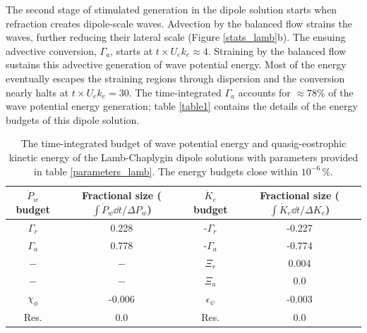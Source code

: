 \documentclass{jfm}
\begin{document}
The second stage of stimulated generation in the dipole solution starts when
refraction creates dipole-scale waves. Advection by the balanced flow
strains the waves, further reducing their lateral scale (Figure
\ref{stats_lamb}b). The ensuing advective conversion, $\Gamma_a$, starts
at $t\times U_e k_e \approx 4$. Straining by the balanced flow sustains this
advective generation of wave potential energy. Most of the energy eventually
escapes the straining regions through dispersion and the conversion nearly halts at
$t\times U_e k_e = 30$.
The time-integrated $\Gamma_a$ accounts for $\approx 78\%$ of the
wave potential energy generation; table \eqref{table1} contains the details
of the energy budgets of this dipole solution.

%
\begin{table}
\begin{center}
    \caption{The time-integrated budget of wave potential energy and quasig-eostrophic                kinetic energy of the Lamb-Chaplygin dipole solutions with parameters provided in table \ref{parameters_lamb}. The energy budgets close within $10^{-6}\,\%$.\label{table1}}
\begin{tabular}{c|c|c|c}
\hline
$\dot{P}_w$ budget & Fractional size ($\int\dot{P}_w \dd t/\Delta P_w $) & $\dot{K}_e$ budget  & Fractional size ($\int\dot{K}_e \dd t/\Delta K_e$)\\
\hline
$\Gamma_r$ & 0.228 & -$\Gamma_r$ & -0.227 \\
$\Gamma_a$ & 0.778 & -$\Gamma_a$ & -0.774 \\
$-$ & $-$ & $\Xi_r$ & 0.004 \\
$-$ & $-$ & $\Xi_a$ & 0.0 \\
$\chi_\phi$ & -0.006 & $\epsilon_\psi$ & -0.003 \\
Res. & 0.0 & Res. & 0.0 \\
\end{tabular}
\end{center}
\end{table}

%
\end{document}

